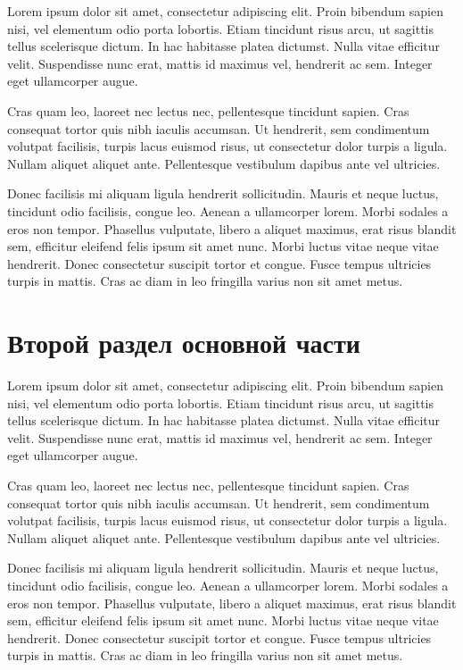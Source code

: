 \documentclass[a4paper,14pt]{extarticle}
\begin{document}
Lorem ipsum dolor sit amet, consectetur adipiscing elit. Proin bibendum sapien nisi, vel elementum odio porta lobortis. Etiam tincidunt risus arcu, ut sagittis tellus scelerisque dictum. In hac habitasse platea dictumst. Nulla vitae efficitur velit. Suspendisse nunc erat, mattis id maximus vel, hendrerit ac sem. Integer eget ullamcorper augue.

Cras quam leo, laoreet nec lectus nec, pellentesque tincidunt sapien. Cras consequat tortor quis nibh iaculis accumsan. Ut hendrerit, sem condimentum volutpat facilisis, turpis lacus euismod risus, ut consectetur dolor turpis a ligula. Nullam aliquet aliquet ante. Pellentesque vestibulum dapibus ante vel ultricies. ~\cite{example1}

Donec facilisis mi aliquam ligula hendrerit sollicitudin. Mauris et neque luctus, tincidunt odio facilisis, congue leo. Aenean a ullamcorper lorem. Morbi sodales a eros non tempor. Phasellus vulputate, libero a aliquet maximus, erat risus blandit sem, efficitur eleifend felis ipsum sit amet nunc. Morbi luctus vitae neque vitae hendrerit. Donec consectetur suscipit tortor et congue. Fusce tempus ultricies turpis in mattis. Cras ac diam in leo fringilla varius non sit amet metus.

\newpage
\section{Второй раздел основной части}

Lorem ipsum dolor sit amet, consectetur adipiscing elit. Proin bibendum sapien nisi, vel elementum odio porta lobortis. Etiam tincidunt risus arcu, ut sagittis tellus scelerisque dictum. In hac habitasse platea dictumst. Nulla vitae efficitur velit. Suspendisse nunc erat, mattis id maximus vel, hendrerit ac sem. Integer eget ullamcorper augue. ~\cite{example2}

Cras quam leo, laoreet nec lectus nec, pellentesque tincidunt sapien. Cras consequat tortor quis nibh iaculis accumsan. Ut hendrerit, sem condimentum volutpat facilisis, turpis lacus euismod risus, ut consectetur dolor turpis a ligula. Nullam aliquet aliquet ante. Pellentesque vestibulum dapibus ante vel ultricies.

Donec facilisis mi aliquam ligula hendrerit sollicitudin. Mauris et neque luctus, tincidunt odio facilisis, congue leo. Aenean a ullamcorper lorem. Morbi sodales a eros non tempor. Phasellus vulputate, libero a aliquet maximus, erat risus blandit sem, efficitur eleifend felis ipsum sit amet nunc. Morbi luctus vitae neque vitae hendrerit. Donec consectetur suscipit tortor et congue. Fusce tempus ultricies turpis in mattis. Cras ac diam in leo fringilla varius non sit amet metus. ~\cite{example3}
\end{document}
